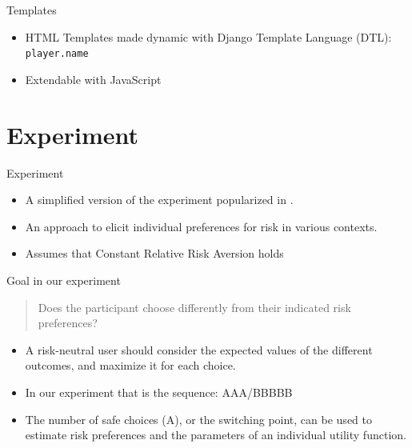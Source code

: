 \documentclass[10pt]{beamer}
\begin{document}
\begin{frame}[fragile]{Templates}
  \begin{itemize}
    \item HTML Templates made dynamic with Django Template Language (DTL): \texttt{{{player.name}}}
    \item Extendable with JavaScript
  \end{itemize}
\end{frame}


\section{Experiment}

\begin{frame}{Experiment}

  \begin{itemize}
    \item A simplified version of the experiment popularized in \textcite{holt_risk_2002}.
    \item An approach to elicit individual preferences for risk in various contexts.
    \item Assumes that Constant Relative Risk Aversion holds
  \end{itemize}
  
\end{frame}

\begin{frame}{Goal in our experiment}
  \begin{quote}
    Does the participant choose differently from their indicated risk preferences? 
  \end{quote}
\end{frame}

\begin{frame}
  \begin{itemize}
    \item A risk-neutral user should consider the expected values of the different outcomes, and maximize it for each choice. 
    \item In our experiment that is the sequence: AAA/BBBBB
    \item The number of safe choices (A), or the switching point, can be used to estimate risk preferences and the parameters of an individual utility function. 
  \end{itemize}
\end{frame}

\begin{frame}
    \small
    
\end{frame}
\end{document}
